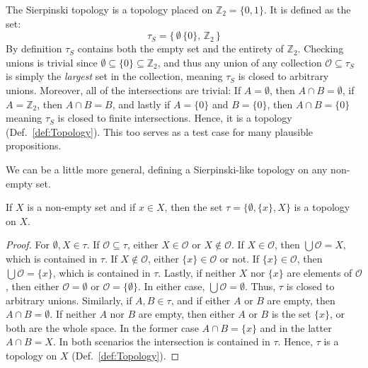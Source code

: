    \begin{example}
        The Sierpinski topology is a topology placed
        on $\mathbb{Z}_{2}=\{0,1\}$. It is defined as the set:
        \begin{equation}
            \tau_{S}=\{\,\emptyset\,\{0\},\,\mathbb{Z}_{2}\,\}
        \end{equation}
        By definition $\tau_{S}$ contains both the empty set and the entirety of
        $\mathbb{Z}_{2}$. Checking unions is trivial since
        $\emptyset\subseteq\{0\}\subseteq\mathbb{Z}_{2}$, and thus any union of
        any collection $\mathcal{O}\subseteq\tau_{S}$ is simply the
        \textit{largest} set in the collection, meaning $\tau_{S}$ is closed to
        arbitrary unions. Moreover, all of the intersections are trivial:
        If $A=\emptyset$, then $A\cap{B}=\emptyset$, if $A=\mathbb{Z}_{2}$, then
        $A\cap{B}=B$, and lastly if $A=\{0\}$ and $B=\{0\}$, then
        $A\cap{B}=\{0\}$ meaning $\tau_{S}$ is closed to finite intersections.
        Hence, it is a topology (Def.~\ref{def:Topology}). This too serves as a
        test case for many plausible propositions.
    \end{example}
    We can be a little more general, defining a Sierpinski-like topology on any
    non-empty set.
    \begin{theorem}
        \label{thm:Existence_of_Sierpinski_Like_Topology}%
        If $X$ is a non-empty set and if $x\in{X}$, then the set
        $\tau=\{\emptyset,\{x\},X\}$ is a topology on $X$.
    \end{theorem}
    \begin{proof}
        For $\emptyset,X\in\tau$. If $\mathcal{O}\subseteq\tau$, either
        $X\in\mathcal{O}$ or $X\notin\mathcal{O}$. If $X\in\mathcal{O}$, then
        $\bigcup\mathcal{O}=X$, which is contained in $\tau$. If
        $X\notin\mathcal{O}$, either $\{x\}\in\mathcal{O}$ or not. If
        $\{x\}\in\mathcal{O}$, then $\bigcup\mathcal{O}=\{x\}$, which is
        contained in $\tau$. Lastly, if neither $X$ nor $\{x\}$ are elements of
        $\mathcal{O}$, then either $\mathcal{O}=\emptyset$ or
        $\mathcal{O}=\{\emptyset\}$. In either case,
        $\bigcup\mathcal{O}=\emptyset$. Thus, $\tau$ is closed to arbitrary
        unions. Similarly, if $A,B\in\tau$, and if either $A$ or $B$ are empty,
        then $A\cap{B}=\emptyset$. If neither $A$ nor $B$ are empty, then
        either $A$ or $B$ is the set $\{x\}$, or both are the whole space. In
        the former case $A\cap{B}=\{x\}$ and in the latter $A\cap{B}=X$. In
        both scenarios the intersection is contained in $\tau$. Hence,
        $\tau$ is a topology on $X$ (Def.~\ref{def:Topology}).
    \end{proof}
